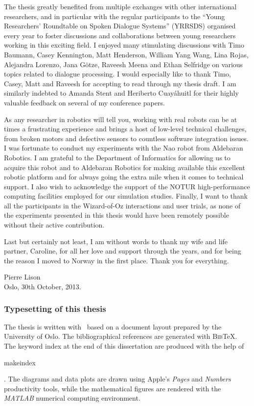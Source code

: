 The thesis greatly benefited from multiple exchanges with other international researchers, and in particular with the regular participants to the ``Young Researchers' Roundtable on Spoken Dialogue Systems'' (YRRSDS) organised every year to foster discussions and collaborations between young researchers working in this exciting field. I enjoyed many stimulating discussions with Timo Baumann, Casey Kennington, Matt Henderson, William Yang Wang, Lina Rojas, Alejandra Lorenzo, Jana G\"otze, Raveesh Meena and Ethan Selfridge on various topics related to dialogue processing.  I would especially like to thank Timo, Casey, Matt and Raveesh for accepting to read through my thesis draft. I am similarly indebted to Amanda Stent and Heriberto Cuay\'{a}huitl for their highly valuable feedback on several of my conference papers.

As any researcher in robotics will tell you, working with real robots can be at times a frustrating experience and brings a host of low-level technical challenges, from broken motors and defective sensors to countless software integration issues. I was fortunate to conduct my experiments with the Nao robot from Aldebaran Robotics.  I am grateful to the Department of Informatics for allowing us to acquire this robot and to Aldebaran Robotics for making available this excellent robotic platform and for always going the extra mile when it comes to technical support. I also wish to acknowledge the support of the NOTUR high-performance computing facilities employed for our simulation studies. Finally, I want to thank all the participants in the Wizard-of-Oz interactions and user trials, as none of the experiments presented in this thesis would have been remotely possible without their active contribution.

Last but certainly not least, I am without words to thank my wife and life partner, Caroline, for all her love and support through the years, and for being the reason I moved to Norway in the first place. Thank you for everything.

\vspace{1cm}

\begin{flushright}Pierre Lison \\ Oslo, 30th October, 2013. \end{flushright}

\null 
\vfill
\begin{footnotesize}\subsubsection*{Typesetting of this thesis}
The thesis is written with \LaTeXe \ based on a document layout prepared by the University of Oslo. The bibliographical references are generated with \textsc{Bib}\negthinspace\TeX.  The keyword index at the end of this dissertation are produced with the help of \begin{scriptsize}\textsf{makeindex}\end{scriptsize}. The diagrams and data plots are drawn using Apple's \textit{Pages} and \textit{Numbers} productivity tools, while the mathematical figures are rendered with the \textit{MATLAB} numerical computing environment.\end{footnotesize}
